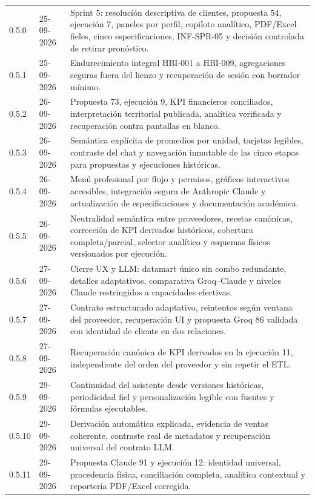 \documentclass[11pt,letterpaper]{article}
\begin{document}
\begin{longtable}{@{}p{0.82in}@{\hspace{0.16in}}p{0.98in}@{\hspace{0.16in}}p{4.36in}@{}}
  0.5.0 & 25-09-2026 & Sprint 5: resolución descriptiva de clientes, propuesta 54, ejecución 7, paneles por perfil, copiloto analítico, PDF/Excel fieles, cinco especificaciones, INF-SPR-05 y decisión controlada de retirar pronóstico. \\
  0.5.1 & 25-09-2026 & Endurecimiento integral HBI-001 a HBI-009, agregaciones seguras fuera del lienzo y recuperación de sesión con borrador mínimo. \\
  0.5.2 & 26-09-2026 & Propuesta 73, ejecución 9, KPI financieros conciliados, interpretación territorial publicada, analítica verificada y recuperación contra pantallas en blanco. \\
  0.5.3 & 26-09-2026 & Semántica explícita de promedios por unidad, tarjetas legibles, contraste del chat y navegación inmutable de las cinco etapas para propuestas y ejecuciones históricas. \\
  0.5.4 & 26-09-2026 & Menú profesional por flujo y permisos, gráficos interactivos accesibles, integración segura de Anthropic Claude y actualización de especificaciones y documentación académica. \\
  0.5.5 & 26-09-2026 & Neutralidad semántica entre proveedores, recetas canónicas, corrección de KPI derivados históricos, cobertura completa/parcial, selector analítico y esquemas físicos versionados por ejecución. \\
  0.5.6 & 27-09-2026 & Cierre UX y LLM: datamart único sin combo redundante, detalles adaptativos, comparativa Groq--Claude y niveles Claude restringidos a capacidades efectivas. \\
  0.5.7 & 27-09-2026 & Contrato estructurado adaptativo, reintentos según ventana del proveedor, recuperación UI y propuesta Groq 86 validada con identidad de cliente en dos relaciones. \\
  0.5.8 & 27-09-2026 & Recuperación canónica de KPI derivados en la ejecución 11, independiente del orden del proveedor y sin repetir el ETL. \\
  0.5.9 & 29-09-2026 & Continuidad del asistente desde versiones históricas, periodicidad fiel y personalización legible con fuentes y fórmulas ejecutables. \\
  0.5.10 & 29-09-2026 & Derivación automática explicada, evidencia de ventas coherente, contraste real de metadatos y recuperación universal del contrato LLM. \\
  0.5.11 & 29-09-2026 & Propuesta Claude 91 y ejecución 12: identidad universal, procedencia física, conciliación completa, analítica contextual y reportería PDF/Excel corregida. \\

\end{longtable}
\end{document}
